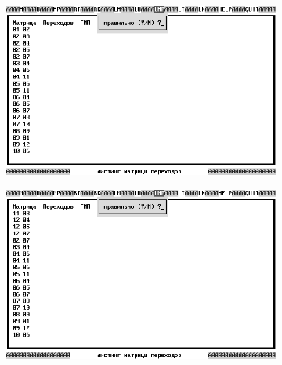 \documentclass[a4paper,oneside,DIV=12,12pt,headings=normal]{scrartcl}
\begin{document}
		\begin{figure}
		\centering
			\begin{subfigure}[t]{0.5\linewidth-0.8em}
			\centering
				\includegraphics[width = \linewidth]{./assets/00-ris-rus_000-bw.png}
			\caption{}
			\label{subfig:ristpic-jump-matrix-00}
			\end{subfigure}
			\quad
			\begin{subfigure}[t]{0.5\linewidth-0.8em}
			\centering
				\includegraphics[width = \linewidth]{./assets/01-ris-rus_001-bw.png}
			\caption{}
			\label{subfig:ristpic-jump-matrix-01}
			\end{subfigure}\vspace*{\floatsep}
			

\end{figure}
\end{document}
